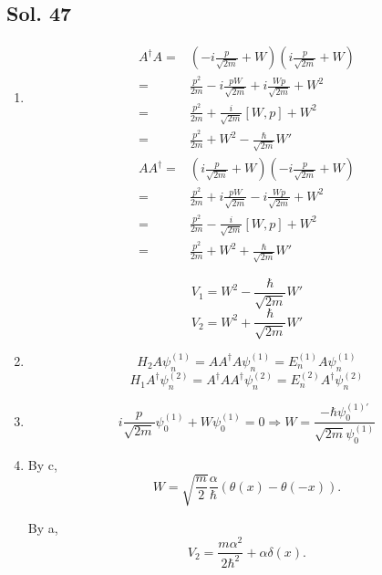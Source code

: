 \subsection*{Sol. 47}
\begin{enumerate}
    \item 
    \begin{align*}
        A^\dagger A
        =&(-i\frac{p}{\sqrt{2m}}+W)
        (i\frac{p}{\sqrt{2m}}+W)\\
        =&\frac{p^2}{2m}
        -i\frac{pW}{\sqrt{2m}}
        +i\frac{Wp}{\sqrt{2m}}+W^2\\
        =&\frac{p^2}{2m}
            +\frac{i}{\sqrt{2m}}[W,p]+W^2
        \\
        =&\frac{p^2}{2m}+W^2-\frac{\hbar}{\sqrt{2m}}W'
    \end{align*}
    \begin{align*}
        A A^\dagger
        =&
        (i\frac{p}{\sqrt{2m}}+W)
        (-i\frac{p}{\sqrt{2m}}+W)\\
        =&\frac{p^2}{2m}
        +i\frac{pW}{\sqrt{2m}}
        -i\frac{Wp}{\sqrt{2m}}+W^2\\
        =&\frac{p^2}{2m}
            -\frac{i}{\sqrt{2m}}[W,p]+W^2
        \\
        =&\frac{p^2}{2m}+W^2+\frac{\hbar}{\sqrt{2m}}W'
    \end{align*}

    $$
    V_1=W^2-\frac{\hbar}{\sqrt{2m}}W'
    $$
    $$
    V_2=W^2+\frac{\hbar}{\sqrt{2m}}W'
    $$
    \item 
    $$
    H_2A\psi_n^{(1)}
    =AA^\dagger A\psi_n^{(1)}
    =E_n^{(1)}A\psi_n^{(1)}
    $$
     $$
    H_1A^\dagger\psi_n^{(2)}
    =A^\dagger A A^\dagger\psi_n^{(2)}
    =E_n^{(2)}A^\dagger\psi_n^{(2)}
    $$
    \item 
    $$
    i\frac{p}{\sqrt{2m}}\psi_0^{(1)}+W
    \psi_0^{(1)} = 0
    \Rightarrow 
    W=\frac{-\hbar\psi_0^{(1)'}}{\sqrt{2m}\psi_0^{(1)}}
    $$
    \item
    By c,
    $$
    W = \sqrt{\frac{m}{2}}
    \frac{\alpha}{\hbar}
    (\theta(x)-\theta(-x)).
    $$

    By a,
    $$
    V_2 = \frac{m\alpha^2}{2\hbar^2}+\alpha\delta(x).
    $$
\end{enumerate}

